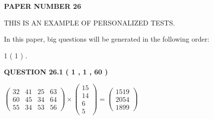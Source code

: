\documentclass[12pt]{article}
\begin{document}
 
 
   
   
\newpage 
\setcounter{page}{ 
    26001 } 
   
   
   
   
 {\textbf{ \Large{ PAPER NUMBER           26  }}}
   
   
\vspace{0.2in}
   
   
   
   
   
   
 \vspace{0.2in}
{\Huge  THIS IS AN EXAMPLE OF}
{\Huge  PERSONALIZED TESTS. }
   
   
   
\vspace{0.2in}
   
In this paper, big questions will be generated in the following order: 
   
   
             1 (           1 )
 .
  
\vspace{0.2in}
  
{\textbf{\Large{QUESTION
26.1 
 (           1 ,           1 ,          60 )
}}}
  
  
 
 
\noindent{}

 
$\left( \begin{array}{ccccccccccccccc}
          32  & 
          41  & 
          25  & 
          63  \\ 
          60  & 
          45  & 
          34  & 
          64  \\ 
          55  & 
          34  & 
          53  & 
          56
\end{array}\right) \times
\left( \begin{array}{c}
          15  \\ 
          14  \\ 
           6  \\ 
           5
\end{array}\right)  =
\left( \begin{array}{c}
        1519  \\ 
        2054  \\ 
        1899
\end{array}\right)  $
 
\end{document}
